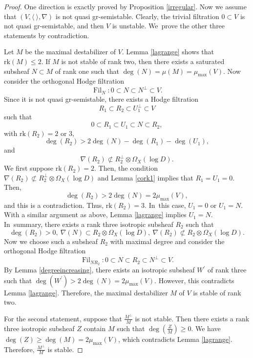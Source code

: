 \documentclass[JEP,XML,SOM,Unicode,published]{cedram}
\newcommand{\grsemistable}{gr\nobreakdash-semi\-stable\xspace}
\DeclareMathOperator{\Filt}{Fil}
\newcommand{\rk}{\mathrm{rk}}
\theoremstyle{plain}
\theoremstyle{definition}
\begin{document}
\begin{proof}
One direction is exactly proved by Proposition \ref{irregular}. Now we assume that $(V,\langle \ \rangle,\nabla)$ is not quasi \grsemistable. Clearly, the trivial filtration $0 \subset V$ is not quasi \grsemistable, and then $V$ is unstable. We~prove the other three statements by contradiction.

Let $M$ be the maximal destabilizer of $V$. Lemma \ref{lagrange} shows that $\rk(M) \leq 2$. If $M$ is not stable of rank two, then there exists a saturated subsheaf $N \subset M$ of rank one such that $\deg(N)=\mu(M)=\mu_{\max}(V)$. Now consider the orthogonal Hodge filtration
\[
\Filt_{N}:0\subset N\subset N^\perp\subset V.
\]
Since it is not quasi \grsemistable, there exists a Hodge filtration
\[
R_1\subset R_2\subset U_1^\perp\subset V
\]
such that
\[
0\subset R_1\subset U_1\subset N \subset R_2,
\]
with $\rk(R_2)=2$ or $3$,
\[
\deg(R_2)>2\deg(N)-\deg(R_1)-\deg(U_1),
\]
and
\[
\nabla(R_2)\not\subset R_2^\perp\otimes\Omega_X(\log D).
\]
We first suppose $\rk(R_2)=2$. Then, the condition $\nabla(R_2)\not\subset R_2^\perp\otimes\Omega_X(\log D)$ and Lemma \ref{cork1} implies that $R_1 = U_1 = 0$. Then,
\[
\deg(R_2)>2\deg(N)=2\mu_{\max}(V),
\]
and this is a contradiction. Thus, $\rk(R_2)=3$. In~this case, $U_1=0$ or $U_1 = N$. With a similar argument as above, Lemma \ref{lagrange} implies $U_1=N$. In~summary, there exists a rank three isotropic subsheaf $R_2$ such that
\[
\deg(R_2)>0,\ \nabla(N)\subset R_2 \otimes \Omega_X(\log D),\ \nabla(R_2)\not\subset R_2 \otimes \Omega_X(\log D).
\]
Now we choose such a subsheaf $R_2$ with maximal degree and consider the orthogonal Hodge filtration
\[
\Filt_{NR_2}:0\subset N\subset R_2\subset N^\perp \subset V.
\]
By Lemma \ref{degreeincreasing}, there exists an isotropic subsheaf $W^\prime$ of rank three such that $\deg(W^\prime)>2\deg(N)=2\mu_{\max}(V)$. However, this contradicts Lemma \ref{lagrange}. Therefore, the maximal destabilizer $M$ of $V$ is stable of rank two.

For the second statement, suppose that $\frac{M^\perp}{M}$ is not stable. Then there exists a rank three isotropic subsheaf $Z$ contain $M$ such that $\deg(\frac{Z}{M})\geq 0$. We have $\deg(Z)\geq \deg(M)=2\mu_{\max}(V)$, which contradicts Lemma \ref{lagrange}. Therefore, $\frac{M^\perp}{M}$ is stable.


\end{proof}
\end{document}
